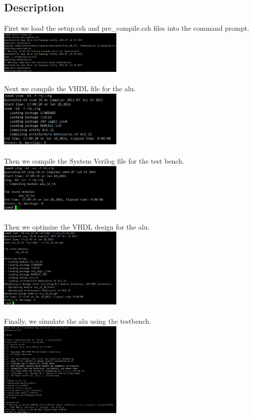 \documentclass{article}
\begin{document}
	\subsection{Description}
		First we load the setup.csh and pre\_compile.csh files into the command prompt.\\
	\includegraphics[width=0.45\textwidth]{mentor1.png}\\\\
		Next we compile the VHDL file for the alu.\\
	\includegraphics[width=0.45\textwidth]{mentor2.png}\\\\
		Then we compile the System Verilog file for the test bench.\\
	\includegraphics[width=0.45\textwidth]{mentor3.png}\\\\
		Then we optimize the VHDL design for the alu.\\
	\includegraphics[width=0.45\textwidth]{mentor4.png}\\\\
		Finally, we simulate the alu using the testbench.\\
	\includegraphics[width=0.45\textwidth]{mentor5.png}
	
\end{document}
